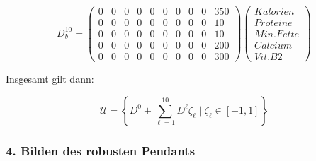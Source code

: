 \documentclass[a4paper,12pt]{article}
\begin{document}
\[
D^{10}_{b} = \begin{pmatrix}
0 & 0 & 0 & 0 & 0 & 0 & 0 & 0 & 0 & 350 \\ %
0 & 0 & 0 & 0 & 0 & 0 & 0 & 0 & 0 & 10 \\ %
0 & 0 & 0 & 0 & 0 & 0 & 0 & 0 & 0 & 10 \\ %
0 & 0 & 0 & 0 & 0 & 0 & 0 & 0 & 0 & 200 \\ %
0 & 0 & 0 & 0 & 0 & 0 & 0 & 0 & 0 & 300 %
\end{pmatrix}
\begin{pmatrix}
    Kalorien \\
    Proteine \\
    Min. Fette \\
    Calcium \\
    Vit. B2
\end{pmatrix}
\]

Insgesamt gilt dann:

\[
\mathcal{U} = \left\{ D^0 + \sum_{\ell=1}^{10}D^{\ell} \zeta_{\ell} \;\vert\; \zeta_{\ell} \in [-1, 1] \right\}
\]

\subsubsection*{4. Bilden des robusten Pendants}
\end{document}
